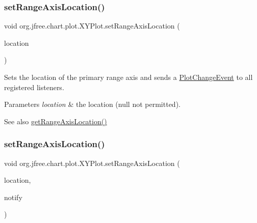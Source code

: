 \subsubsection{\texorpdfstring{set\+Range\+Axis\+Location()}{setRangeAxisLocation()}\hspace{0.1cm}{\footnotesize\ttfamily [1/4]}}
{\footnotesize\ttfamily void org.\+jfree.\+chart.\+plot.\+X\+Y\+Plot.\+set\+Range\+Axis\+Location (\begin{DoxyParamCaption}\item[{\mbox{\hyperlink{classorg_1_1jfree_1_1chart_1_1axis_1_1_axis_location}{Axis\+Location}}}]{location }\end{DoxyParamCaption})}

Sets the location of the primary range axis and sends a \mbox{\hyperlink{}{Plot\+Change\+Event}} to all registered listeners.


\begin{DoxyParams}{Parameters}
{\em location} & the location ({\ttfamily null} not permitted).\\
\hline
\end{DoxyParams}
\begin{DoxySeeAlso}{See also}
\mbox{\hyperlink{classorg_1_1jfree_1_1chart_1_1plot_1_1_x_y_plot_a6fb19e12902c04095a10b90a2c22dc05}{get\+Range\+Axis\+Location()}} 
\end{DoxySeeAlso}
\mbox{\label{classorg_1_1jfree_1_1chart_1_1plot_1_1_x_y_plot_ab13f40394bf3637080dc38da7209d29f}} 
\subsubsection{\texorpdfstring{set\+Range\+Axis\+Location()}{setRangeAxisLocation()}\hspace{0.1cm}{\footnotesize\ttfamily [2/4]}}
{\footnotesize\ttfamily void org.\+jfree.\+chart.\+plot.\+X\+Y\+Plot.\+set\+Range\+Axis\+Location (\begin{DoxyParamCaption}\item[{\mbox{\hyperlink{classorg_1_1jfree_1_1chart_1_1axis_1_1_axis_location}{Axis\+Location}}}]{location,  }\item[{boolean}]{notify }\end{DoxyParamCaption})}


